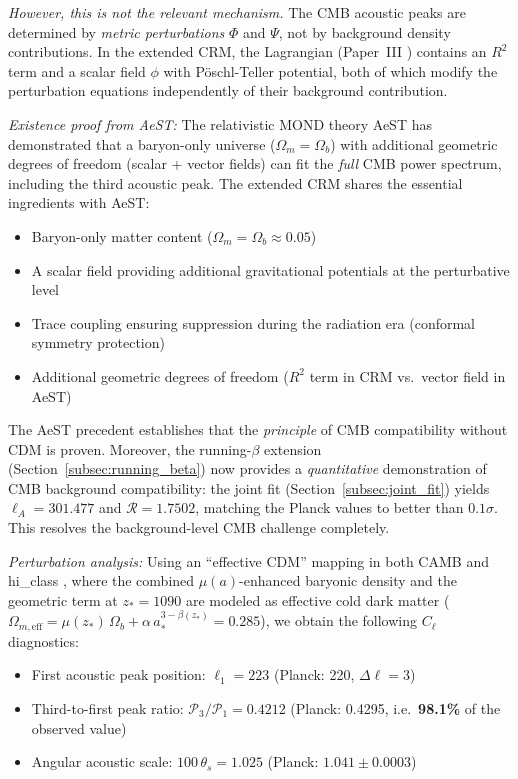 \documentclass[aps,prd,twocolumn,superscriptaddress,nofootinbib]{revtex4-2}
\begin{document}
\textit{However, this is not the relevant mechanism.} The CMB acoustic peaks are determined by \textit{metric perturbations} $\Phi$ and $\Psi$, not by background density contributions. In the extended CRM, the Lagrangian (Paper~III \cite{Geiger2026c}) contains an $R^2$ term and a scalar field $\phi$ with P\"oschl-Teller potential, both of which modify the perturbation equations independently of their background contribution.

\textit{Existence proof from AeST:} The relativistic MOND theory AeST \cite{Skordis2021} has demonstrated that a baryon-only universe ($\Omega_m = \Omega_b$) with additional geometric degrees of freedom (scalar + vector fields) can fit the \textit{full} CMB power spectrum, including the third acoustic peak. The extended CRM shares the essential ingredients with AeST:
\begin{itemize}
\item Baryon-only matter content ($\Omega_m = \Omega_b \approx 0.05$)
\item A scalar field providing additional gravitational potentials at the perturbative level
\item Trace coupling ensuring suppression during the radiation era (conformal symmetry protection)
\item Additional geometric degrees of freedom ($R^2$ term in CRM vs.\ vector field in AeST)
\end{itemize}

The AeST precedent establishes that the \textit{principle} of CMB compatibility without CDM is proven. Moreover, the running-$\beta$ extension (Section~\ref{subsec:running_beta}) now provides a \textit{quantitative} demonstration of CMB background compatibility: the joint fit (Section~\ref{subsec:joint_fit}) yields $\ell_A = 301.477$ and $\mathcal{R} = 1.7502$, matching the Planck values to better than $0.1\sigma$. This resolves the background-level CMB challenge completely.

\textit{Perturbation analysis:} Using an ``effective CDM'' mapping in both CAMB \cite{Lewis2000} and hi\_class \cite{Zumalacarregui2017}, where the combined $\mu(a)$-enhanced baryonic density and the geometric term at $z_* = 1090$ are modeled as effective cold dark matter ($\Omega_{m,\mathrm{eff}} = \mu(z_*)\,\Omega_b + \alpha\,a_*^{3-\beta(z_*)} = 0.285$), we obtain the following $C_\ell$ diagnostics:
\begin{itemize}
\item First acoustic peak position: $\ell_1 = 223$ (Planck: 220, $\Delta\ell = 3$)
\item Third-to-first peak ratio: $\mathcal{P}_3/\mathcal{P}_1 = 0.4212$ (Planck: 0.4295, i.e.\ \textbf{98.1\%} of the observed value)
\item Angular acoustic scale: $100\,\theta_s = 1.025$ (Planck: $1.041 \pm 0.0003$)
\end{itemize}
\end{document}
